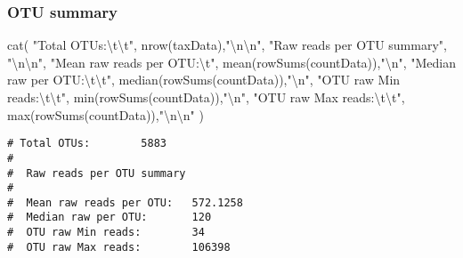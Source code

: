 \documentclass[
]{article}
\newenvironment{Shaded}{\begin{snugshade}}{\end{snugshade}}
\newcommand{\FunctionTok}[1]{\textcolor[rgb]{0.00,0.00,0.00}{#1}}
\newcommand{\NormalTok}[1]{#1}
\newcommand{\SpecialCharTok}[1]{\textcolor[rgb]{0.00,0.00,0.00}{#1}}
\newcommand{\StringTok}[1]{\textcolor[rgb]{0.31,0.60,0.02}{#1}}
\begin{document}
\hypertarget{otu-summary-1}{%
\subsubsection{OTU summary}\label{otu-summary-1}}

\begin{Shaded}
\begin{Highlighting}[]
\FunctionTok{cat}\NormalTok{(}
  \StringTok{"Total OTUs:}\SpecialCharTok{\textbackslash{}t\textbackslash{}t}\StringTok{"}\NormalTok{, }\FunctionTok{nrow}\NormalTok{(taxData),}\StringTok{"}\SpecialCharTok{\textbackslash{}n\textbackslash{}n}\StringTok{"}\NormalTok{,}
  \StringTok{"Raw reads per OTU summary"}\NormalTok{, }\StringTok{"}\SpecialCharTok{\textbackslash{}n\textbackslash{}n}\StringTok{"}\NormalTok{,}
  \StringTok{"Mean raw reads per OTU:}\SpecialCharTok{\textbackslash{}t}\StringTok{"}\NormalTok{, }\FunctionTok{mean}\NormalTok{(}\FunctionTok{rowSums}\NormalTok{(countData)),}\StringTok{"}\SpecialCharTok{\textbackslash{}n}\StringTok{"}\NormalTok{,}
  \StringTok{"Median raw per OTU:}\SpecialCharTok{\textbackslash{}t\textbackslash{}t}\StringTok{"}\NormalTok{, }\FunctionTok{median}\NormalTok{(}\FunctionTok{rowSums}\NormalTok{(countData)),}\StringTok{"}\SpecialCharTok{\textbackslash{}n}\StringTok{"}\NormalTok{,}
  \StringTok{"OTU raw Min reads:}\SpecialCharTok{\textbackslash{}t\textbackslash{}t}\StringTok{"}\NormalTok{, }\FunctionTok{min}\NormalTok{(}\FunctionTok{rowSums}\NormalTok{(countData)),}\StringTok{"}\SpecialCharTok{\textbackslash{}n}\StringTok{"}\NormalTok{,}
  \StringTok{"OTU raw Max reads:}\SpecialCharTok{\textbackslash{}t\textbackslash{}t}\StringTok{"}\NormalTok{, }\FunctionTok{max}\NormalTok{(}\FunctionTok{rowSums}\NormalTok{(countData)),}\StringTok{"}\SpecialCharTok{\textbackslash{}n\textbackslash{}n}\StringTok{"}
\NormalTok{)}
\end{Highlighting}
\end{Shaded}

\begin{verbatim}
# Total OTUs:        5883 
# 
#  Raw reads per OTU summary 
# 
#  Mean raw reads per OTU:   572.1258 
#  Median raw per OTU:       120 
#  OTU raw Min reads:        34 
#  OTU raw Max reads:        106398
\end{verbatim}
\end{document}
